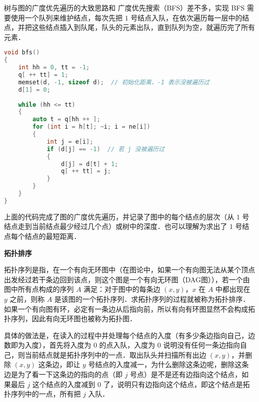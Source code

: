 
树与图的广度优先遍历的大致思路和 广度优先搜索（BFS）差不多，实现 BFS 需要使用一个队列来维护结点，每次先把 $1$ 号结点入队，在依次遍历每一层中的结点，并把这些结点插入到队尾，队头的元素出队，直到队列为空，就遍历完了所有元素．

\begin{lstlisting}[language=cpp]
void bfs()
{
    int hh = 0, tt = -1;
    q[ ++ tt] = 1;
    memset(d, -1, sizeof d);  // 初始化距离，-1 表示没被遍历过
    d[1] = 0;
    
    while (hh <= tt)
    {
        auto t = q[hh ++ ];
        for (int i = h[t]; ~i; i = ne[i])
        {
            int j = e[i];
            if (d[j] == -1)  // 若 j 没被遍历过
            {
                d[j] = d[t] + 1;
                q[ ++ tt] = j;
            }
        }
    }
}
\end{lstlisting}

上面的代码完成了图的广度优先遍历，并记录了图中的每个结点的层次（从 $1$ 号结点走到当前结点最少经过几个点）或树中的深度．也可以理解为求出了 $1$ 号结点每个结点的最短距离．

\textbf{拓扑排序}

拓扑序列是指，在一个有向无环图中（在图论中，如果一个有向图无法从某个顶点出发经过若干条边回到该点，则这个图是一个有向无环图（DAG图）），若一个由图中所有点构成的序列 $A$ 满足：对于图中的每条边 $(x, y)$，$x$ 在 $A$ 中都出现在 $y$ 之前，则称 $A$ 是该图的一个拓扑序列．求拓扑序列的过程就被称为拓扑排序．如果一个有向图有环，必定有一条边从后指向前，所以有向有环图显然不会构成拓扑序列，因此有向无环图也被称为拓扑图．

具体的做法是，在读入的过程中并处理每个结点的入度（有多少条边指向自己，边数即为入度），首先将入度为 $0$ 的点入队，入度为 $0$ 说明没有任何一条边指向自己，则当前结点就是拓扑序列中的一点．取出队头并扫描所有出边 $(x, y)$，并删除 $(x, y)$ 这条边，即让 $y$ 号结点的入度减一，为什么删除这条边呢，删除这条边是为了看一下这条边的指向的点（即 $j$ 号点）是不是还有边指向这个结点，如果最后 $j$ 这个结点的入度减到 $0$ 了，说明只有边指向这个结点，即这个结点是拓扑序列中的一点，所有把 $j$ 入队．